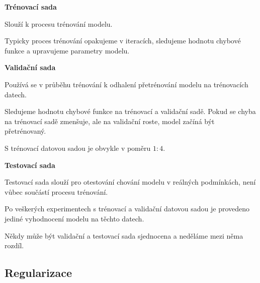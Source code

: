 \begin{compactitem}
    \item \textbf{Trénovací sada} \begin{compactitem}
        \item Slouží k procesu trénování modelu.
        \item Typicky proces trénování opakujeme v iteracích, sledujeme hodnotu chybové funkce a upravujeme parametry modelu.
    \end{compactitem}

    \item \textbf{Validační sada} \begin{compactitem}
        \item Používá se v průběhu trénování k odhalení přetrénování modelu na trénovacích datech.
        \item Sledujeme hodnotu chybové funkce na trénovací a validační sadě. Pokud se chyba na trénovací sadě zmenšuje, ale na validační roste, model začíná být přetrénovaný.
        \item S trénovací datovou sadou je obvykle v poměru $1 : 4$.
    \end{compactitem}

    \item \textbf{Testovací sada} \begin{compactitem}
        \item Testovací sada slouží pro otestování chování modelu v reálných podmínkách, není vůbec součástí procesu trénování.
        \item Po veškerých experimentech s trénovací a validační datovou sadou je provedeno jediné vyhodnocení modelu na těchto datech.
        \item Někdy může být validační a testovací sada sjednocena a neděláme mezi něma rozdíl.
    \end{compactitem}
\end{compactitem}

\subsection{Regularizace}

